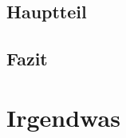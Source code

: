 \documentclass[12pt,ngerman,parskip=half]{scrreprt}
\begin{document}
\section{Hauptteil}

\blindtext[1] 

\blindtext[1]

\section{Fazit}

\blindtext[1] 

\chapter{Irgendwas}
\end{document}
